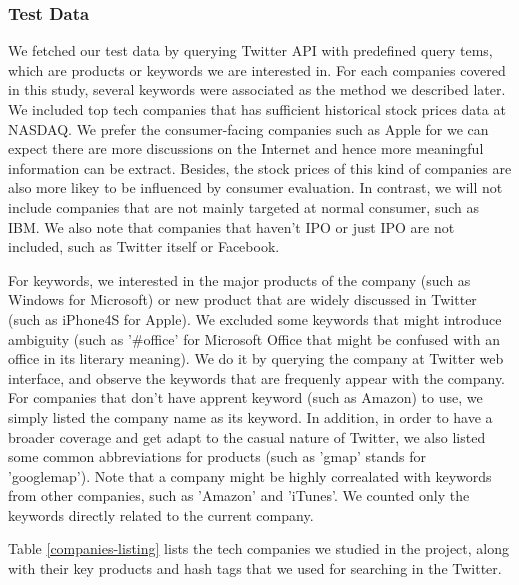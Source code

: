 \documentclass[12pt]{article}
\begin{document}
\subsubsection{Test Data}
We fetched our test data by querying Twitter API with predefined query tems, which are products or keywords we are interested in. For each companies covered in this study, several keywords were associated as the method we described later. We included top tech companies that has sufficient historical stock prices data at NASDAQ. We prefer the consumer-facing companies such as Apple for we can expect there are more discussions on the Internet and hence more meaningful information can be extract. Besides, the stock prices of this kind of companies are also more likey to be influenced by consumer evaluation. In contrast, we will not include companies that are not mainly targeted at normal consumer, such as IBM. We also note that companies that haven't IPO or just IPO are not included, such as Twitter itself or Facebook.

For keywords, we interested in the major products of the company (such as Windows for Microsoft) or new product that are widely discussed in Twitter (such as iPhone4S for Apple). We excluded some keywords that might introduce ambiguity (such as '\#office' for Microsoft Office that might be confused with an office in its literary meaning). We do it by querying the company at Twitter web interface, and observe the keywords that are frequenly appear with the company. For companies that don't have apprent keyword (such as Amazon) to use, we simply listed the company name as its keyword. In addition, in order to have a broader coverage and get adapt to the casual nature of Twitter, we also listed some common abbreviations for products (such as 'gmap' stands for 'googlemap'). Note that a company might be highly correalated with keywords from other companies, such as 'Amazon' and 'iTunes'. We counted only the keywords directly related to the current company.

Table \ref{companies-listing} lists the tech companies we studied in the project, along with their key products and hash tags that we used for searching in the Twitter. 
\end{document}
